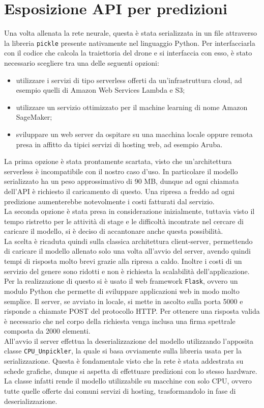\section{Esposizione API per predizioni}
Una volta allenata la rete neurale, questa è stata serializzata in un file attraverso la libreria \verb|pickle| presente nativamente nel linguaggio Python. Per interfacciarla con il codice che calcola la traiettoria del drone e si interfaccia con esso, è stato necessario scegliere tra una delle seguenti opzioni:
\begin{itemize}
    \item utilizzare i servizi di tipo serverless offerti da un'infrastruttura cloud, ad esempio quelli di Amazon Web Services Lambda e S3;
    \item utilizzare un servizio ottimizzato per il machine learning di nome Amazon SageMaker;
    \item sviluppare un web server da ospitare su una macchina locale oppure remota presa in affitto da tipici servizi di hosting web, ad esempio Aruba.
\end{itemize}
La prima opzione è stata prontamente scartata, visto che un'architettura serverless è incompatibile con il nostro caso d'uso. In particolare il modello serializzato ha un peso approssimativo di 90 MB, dunque ad ogni chiamata dell'API è richiesto il caricamento di questo. Una ripresa a freddo ad ogni predizione aumenterebbe notevolmente i costi fatturati dal servizio.\\
La seconda opzione è stata presa in considerazione inizialmente, tuttavia visto il tempo ristretto per le attività di stage e le difficoltà incontrate nel cercare di caricare il modello, si è deciso di accantonare anche questa possibilità.\\
La scelta è ricaduta quindi sulla classica architettura client-server, permettendo di caricare il modello allenato solo una volta all'avvio del server, avendo quindi tempi di risposta molto brevi grazie alla ripresa a caldo. Inoltre i costi di un servizio del genere sono ridotti e non è richiesta la scalabilità dell'applicazione.\\
Per la realizzazione di questo si è usato il web framework \verb|Flask|, ovvero un modulo Python che permette di sviluppare applicazioni web in modo molto semplice. Il server, se avviato in locale, si mette in ascolto sulla porta 5000 e risponde a chiamate POST del protocollo HTTP. Per ottenere una risposta valida è necessario che nel corpo della richiesta venga inclusa una firma spettrale composta da 2000 elementi.\\
All'avvio il server effettua la deserializzazione del modello utilizzando l'apposita classe \verb|CPU_Unpickler|, la quale si basa ovviamente sulla libreria usata per la serializzazione. Questa è fondamentale visto che la rete è stata addestrata su schede grafiche, dunque si aspetta di effettuare predizioni con lo stesso hardware. La classe infatti rende il modello utilizzabile su macchine con solo CPU, ovvero tutte quelle offerte dai comuni servizi di hosting, trasformandolo in fase di deserializzazione.
